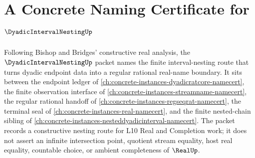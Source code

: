 \chapter{A Concrete Naming Certificate for $\DyadicIntervalNestingUp$}
\label{ch:concrete-instances-dyadic-interval-nesting-namecert}

Following Bishop and Bridges' constructive real analysis, the $\DyadicIntervalNestingUp$ packet names the finite interval-nesting route that turns dyadic endpoint data into a regular rational real-name boundary. It sits between the endpoint ledger of \autoref{ch:concrete-instances-dyadicratcore-namecert}, the finite observation interface of \autoref{ch:concrete-instances-streamname-namecert}, the regular rational handoff of \autoref{ch:concrete-instances-regseqrat-namecert}, the terminal seal of \autoref{ch:concrete-instances-real-namecert}, and the finite nested-chain sibling of \autoref{ch:concrete-instances-nesteddyadicinterval-namecert}. The packet records a constructive nesting route for L10 Real and Completion work; it does not assert an infinite intersection point, quotient stream equality, host real equality, countable choice, or ambient completeness of $\RealUp$.

